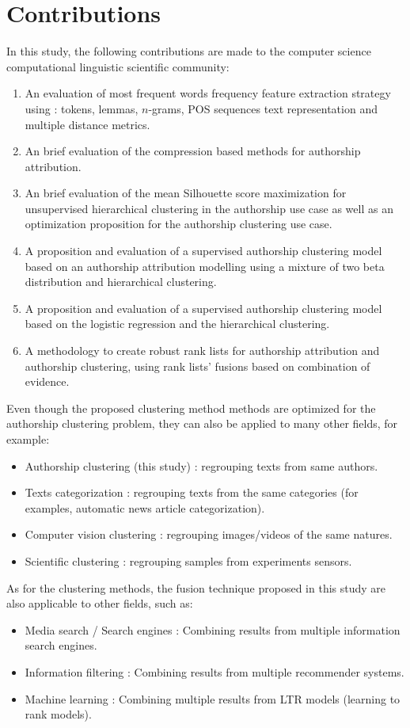 \section{Contributions}

In this study, the following contributions are made to the computer science computational linguistic scientific community:

\begin{enumerate}
  \item
  An evaluation of most frequent words frequency feature extraction strategy using : tokens, lemmas, $n$-grams, POS sequences text representation and multiple distance metrics.
  \item
  An brief evaluation of the compression based methods for authorship attribution.
  \item
  An brief evaluation of the mean Silhouette score maximization for unsupervised hierarchical clustering in the authorship use case as well as an optimization proposition for the authorship clustering use case.
  \item
  A proposition and evaluation of a supervised authorship clustering model based on an authorship attribution modelling using a mixture of two beta distribution and hierarchical clustering.
  \item
  A proposition and evaluation of a supervised authorship clustering model based on the logistic regression and the hierarchical clustering.
  \item
  A methodology to create robust rank lists for authorship attribution and authorship clustering, using rank lists' fusions based on combination of evidence.
\end{enumerate}

Even though the proposed clustering method methods are optimized for the authorship clustering problem, they can also be applied to many other fields, for example:
\begin{itemize}
  \item
  Authorship clustering (this study) : regrouping texts from same authors.
  \item
  Texts categorization : regrouping texts from the same categories (for examples, automatic news article categorization).
  \item
  Computer vision clustering : regrouping images/videos of the same natures.
  \item
  Scientific clustering : regrouping samples from experiments sensors.
\end{itemize}

As for the clustering methods, the fusion technique proposed in this study are also applicable to other fields, such as:
\begin{itemize}
  \item
  Media search / Search engines : Combining results from multiple information search engines.
  \item
  Information filtering : Combining results from multiple recommender systems.
  \item
  Machine learning : Combining multiple results from LTR models (learning to rank models).
\end{itemize}
